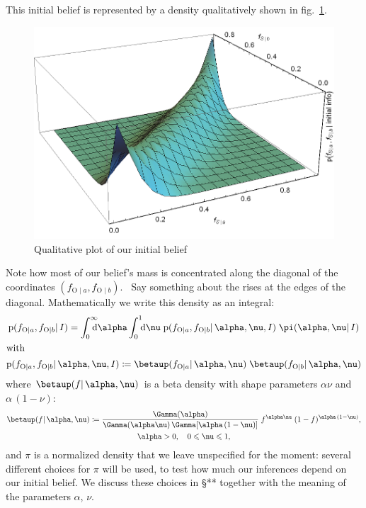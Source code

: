 \documentclass[\ifafour a4paper,12pt,\else a5paper,10pt,\fi%
onecolumn,oneside,article,%
british%
]{memoir}
\theoremstyle{remark}
\theoremstyle{innote}
\newcommand*{\di}{\mathrm{d}}%
\newcommand*{\defd}{\coloneqq}
\renewcommand{\le}{\leqslant}%
\newcommand*{\pf}{\mathrm{p}}%
\renewcommand*{\|}{\mathpunct{|}}
\newcommand*{\sect}{\S}%
\newcommand*{\fig}{fig.}%
\newcommand*{\puzzle}{\maltese}
\newcommand{\mynote}[1]{ {\color{notecolour}\puzzle\ #1}}
\newcommand*{\yI}{I}
\newcommand*{\ya}{a}
\newcommand*{\yb}{b}
\newcommand*{\ysA}{\textrm{O}}%
\newcommand*{\dbeta}{\betaup}
\newcommand*{\dA}{\pi}
\newcommand*{\yA}{\alpha}
\newcommand*{\yq}{\nu}
\begin{document}
This initial belief is represented by a density qualitatively shown in
\fig~\ref{fig:initial_belief}.
\begin{figure}[b!]%
 \centering\includegraphics[width=0.95\linewidth]{prior3d.png}
\caption{Qualitative plot of our initial belief}\label{fig:initial_belief}
\end{figure}%
Note how most of our belief's mass is concentrated along the diagonal of
the coordinates $(f_{\ysA\|\ya}, f_{\ysA\|\yb})$. \mynote{Say something
  about the rises at the edges of the diagonal.} Mathematically we write
this density as an integral:
\begin{gather}
  \label{eq:beta_gamma_prior}
  \pf(f_{\ysA\|\ya}, f_{\ysA\|\yb} \| \yI)
  =
  \int_{\mathrlap{0}}^{\mathrlap{\infty}}\di\yA
  \int_{\mathrlap{0}}^{\mathrlap{1}}\di\yq\;
\pf(f_{\ysA\|\ya}, f_{\ysA\|\yb} \| \yA,\yq,\yI)\;
  \dA(\yA,\yq \| \yI)
  \\
\shortintertext{with}
  \label{eq:def_ff_given_Aq}
\pf(f_{\ysA\|\ya}, f_{\ysA\|\yb} \| \yA,\yq,\yI)\defd
  \dbeta(f_{\ysA\|\ya} \| \yA,\yq)\;
  \dbeta(f_{\ysA\|\yb} \| \yA,\yq)
\end{gather}
where $\dbeta(f \| \yA,\yq)$ is a beta density with shape
parameters $\yA\yq$ and $\yA\,(1-\yq)$:
\begin{multline}
  \label{eq:def_beta}
  \dbeta(f \| \yA,\yq) \defd
  \frac{\Gamma(\yA)}{\Gamma(\yA\yq)\,\Gamma[\yA\,(1-\yq)]}\;
  f^{\yA\yq}\;(1-f)^{\yA\,(1-\yq)},\\
  \yA>0,\quad 0\le\yq\le1,
\end{multline}
and $\dA$ is a normalized density that we leave unspecified for the moment: several
different choices for $\dA$ will be used, to test how much our inferences
depend on our initial belief. We discuss these choices in \sect*** together
with the meaning of the parameters $\yA$, $\yq$.
\end{document}
